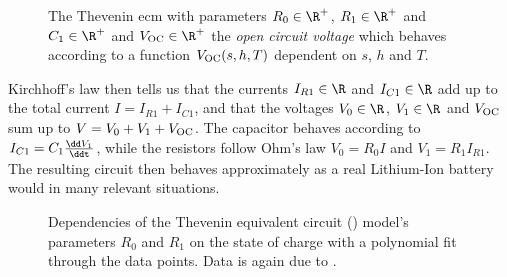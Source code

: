 \documentclass{prettytex/ox/mmsc-special-topic}
\begin{document}
  \begin{figure}[H]
    \centering
    \caption{
      The Thevenin \gls{ecm} with parameters $R_0 \in \R^+$, $R_1 \in \R^+$ and $C_1 \in \R^+$ and $V_{\rm OC} \in \R^+$ the \textit{open circuit voltage} which behaves according to a function $V_{\rm OC}(s, h, T)$ dependent on $s$, $h$ and $T$.
    }
    \label{fig:ecm}
  \end{figure}

  Kirchhoff's law then tells us that the currents $I_{R1} \in \R$ and $I_{C1} \in \R$ add up to the total current $I = I_{R1} + I_{C1}$, and that the voltages $V_0 \in \R$, $V_1 \in \R$ and $V_{\rm OC}$ sum up to $V = V_0 + V_1 + V_{\rm OC}$.
  The capacitor behaves according to $I_{C1} = C_1 \frac{\dd V_1}{\ddt}$, while the resistors follow Ohm's law $V_0 = R_0 I$ and $V_1 = R_1 I_{R1}$.
  The resulting circuit then behaves approximately as a real Lithium-Ion battery would in many relevant situations.

  \begin{figure}[H]
    \captionsetup[subfigure]{justification=centering}
    \centering
    \hfill
    \par
    \caption{Dependencies of the Thevenin equivalent circuit () model's parameters $R_0$ and $R_1$ on the state of charge with a polynomial fit through the data points. Data is again due to \cite{panasonicnums}.}
    \label{fig:parameters}
  \end{figure}
\end{document}
